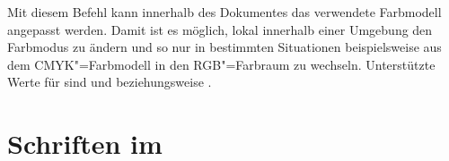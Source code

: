 \begin{DeclareEntity}{}
\begin{Declaration}
  {}
\printdeclarationlist

Mit diesem Befehl kann innerhalb des Dokumentes das verwendete Farbmodell 
angepasst werden. Damit ist es möglich, lokal innerhalb einer Umgebung den 
Farbmodus zu ändern und so nur in bestimmten Situationen beispielsweise aus dem 
CMYK"=Farbmodell in den RGB"=Farbraum zu wechseln. Unterstützte Werte für 
 sind  und  beziehungsweise 
.
\end{Declaration}

\medskip\noindent
{}
\end{DeclareEntity}
%



\section[%
  Das Paket \Package{tudscrfonts} -- Schriften im \CD%
]{%
  Schriften im \CD%
}

